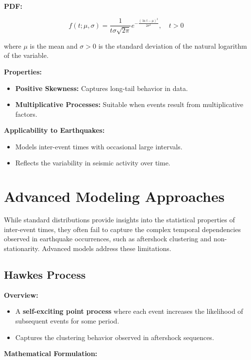 \documentclass{article}
\begin{document}
\textbf{PDF:}

\[
f(t; \mu, \sigma) = \frac{1}{t \sigma \sqrt{2\pi}} e^{- \frac{(\ln t - \mu)^2}{2\sigma^2}}, \quad t > 0
\]

where $\mu$ is the mean and $\sigma > 0$ is the standard deviation of the natural logarithm of the variable.

\textbf{Properties:}

\begin{itemize}
    \item \textbf{Positive Skewness:} Captures long-tail behavior in data.
    \item \textbf{Multiplicative Processes:} Suitable when events result from multiplicative factors.
\end{itemize}

\textbf{Applicability to Earthquakes:}

\begin{itemize}
    \item Models inter-event times with occasional large intervals.
    \item Reflects the variability in seismic activity over time.
\end{itemize}

\section{Advanced Modeling Approaches}

While standard distributions provide insights into the statistical properties of inter-event times, they often fail to capture the complex temporal dependencies observed in earthquake occurrences, such as aftershock clustering and non-stationarity. Advanced models address these limitations.

\subsection{Hawkes Process}

\textbf{Overview:}

\begin{itemize}
    \item A \textbf{self-exciting point process} where each event increases the likelihood of subsequent events for some period.
    \item Captures the clustering behavior observed in aftershock sequences.
\end{itemize}

\textbf{Mathematical Formulation:}
\end{document}
